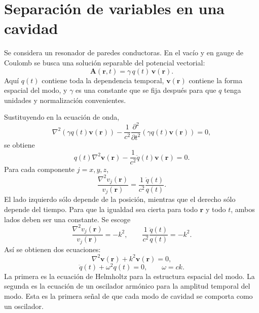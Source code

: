 \documentclass[11pt]{article}
\newcommand{\vb}[1]{\mathbf{#1}}
\begin{document}
\section{Separaci\'on de variables en una cavidad}

Se considera un resonador de paredes conductoras. En el vac\'io y en gauge de
Coulomb se busca una soluci\'on separable del potencial vectorial:
\begin{equation}
  \vb A(\vb r,t)=\gamma\,q(t)\,\vb v(\vb r).
\end{equation}
Aqu\'i $q(t)$ contiene toda la dependencia temporal, $\vb v(\vb r)$ contiene
la forma espacial del modo, y $\gamma$ es una constante que se fija despu\'es
para que $q$ tenga unidades y normalizaci\'on convenientes.

Sustituyendo en la ecuaci\'on de onda,
\begin{equation}
  \nabla^2(\gamma q(t)\vb v(\vb r))
  -
  \frac{1}{c^2}
  \frac{\partial^2}{\partial t^2}
  (\gamma q(t)\vb v(\vb r))
  =
  0,
\end{equation}
se obtiene
\begin{equation}
  q(t)\nabla^2\vb v(\vb r)
  -
  \frac{1}{c^2}
  \ddot q(t)\vb v(\vb r)
  =
  0.
\end{equation}
Para cada componente $j=x,y,z$,
\begin{equation}
  \frac{\nabla^2 v_j(\vb r)}{v_j(\vb r)}
  =
  \frac{1}{c^2}
  \frac{\ddot q(t)}{q(t)}.
\end{equation}
El lado izquierdo s\'olo depende de la posici\'on, mientras que el derecho
s\'olo depende del tiempo. Para que la igualdad sea cierta para todo
$\vb r$ y todo $t$, ambos lados deben ser una constante. Se escoge
\begin{equation}
  \frac{\nabla^2 v_j(\vb r)}{v_j(\vb r)}
  =
  -k^2,
  \qquad
  \frac{1}{c^2}\frac{\ddot q(t)}{q(t)}
  =
  -k^2.
\end{equation}
As\'i se obtienen dos ecuaciones:
\begin{equation}
  \boxed{
  \nabla^2\vb v(\vb r)+k^2\vb v(\vb r)=0,
  }
\end{equation}
\begin{equation}
  \boxed{
  \ddot q(t)+\omega^2q(t)=0,
  \qquad
  \omega=ck.
  }
\end{equation}
La primera es la ecuaci\'on de Helmholtz para la estructura espacial del modo.
La segunda es la ecuaci\'on de un oscilador arm\'onico para la amplitud
temporal del modo. Esta es la primera se\~nal de que cada modo de cavidad se
comporta como un oscilador.
\end{document}

